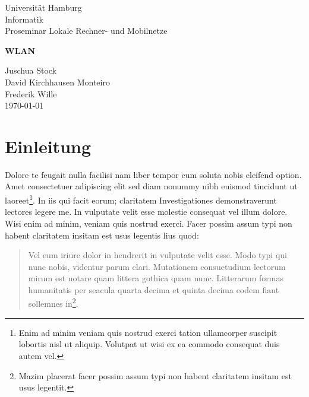 \documentclass[a4paper,12pt]{scrartcl}
\begin{document}
\begin{titlepage}
\begin{small}
\vfill {Universität Hamburg \\ Informatik \\ Proseminar Lokale Rechner- und Mobilnetze }
\end{small}


\begin{center}
\begin{Large}
\vfill {\textsf{\textbf{
WLAN
}}}
\end{Large}
\end{center}

\begin{small}
\vfill Juschua Stock \\ David Kirchhausen Monteiro \\ Frederik Wille \\
\today
\end{small}

\end{titlepage}


\tableofcontents
\thispagestyle{empty}

\clearpage

\onehalfspacing

\pagestyle{plain}


\section{Einleitung}
Dolore te feugait nulla facilisi nam liber tempor cum soluta nobis eleifend option. Amet consectetuer adipiscing elit sed diam nonummy nibh euismod tincidunt ut laoreet\footnote{Enim ad minim veniam quis nostrud exerci tation ullamcorper suscipit lobortis nisl ut aliquip. Volutpat ut wisi ex ea commodo consequat duis autem vel. }. In iis qui facit eorum; claritatem Investigationes demonstraverunt lectores legere me. In vulputate velit esse molestie consequat vel illum dolore. Wisi enim ad minim, veniam quis nostrud exerci. Facer possim assum typi non habent claritatem insitam est usus legentis lius quod:

\begin{quote}
Vel eum iriure dolor in hendrerit in vulputate velit esse. Modo typi qui nunc nobis, videntur parum clari. Mutationem consuetudium lectorum mirum est notare quam littera gothica quam nunc. Litterarum formas humanitatis per seacula quarta decima et quinta decima eodem fiant sollemnes in\footnote{Mazim placerat facer possim assum typi non habent claritatem insitam est usus legentit.}.
\end{quote}
\end{document}
